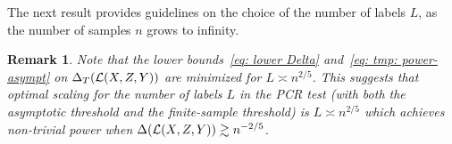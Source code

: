 \documentclass[11pt]{article}
\newtheorem{rmk}[propo]{Remark}
\newcommand{\indep}{\perp \!\!\! \perp}
\begin{document}
The next result provides guidelines on the choice of the number of labels $L$, as the number of samples $n$ grows to infinity. 
\begin{rmk}\label{rmk: optimal-L}
Note that the lower bounds~\eqref{eq: lower Delta} and~\eqref{eq: tmp: power-asympt} on $\Delta_{T}(\mathcal{L}(X,Z,Y))$ are minimized for $L\asymp n^{2/5}$. This suggests that optimal scaling for the number of labels $L$ in the PCR test (with both the asymptotic threshold and the finite-sample threshold) is $L\asymp n^{2/5}$ which achieves non-trivial power when $\Delta(\mathcal{L}(X,Z,Y))\gtrsim n^{-2/5}$.
\end{rmk}  
%





\end{document}
